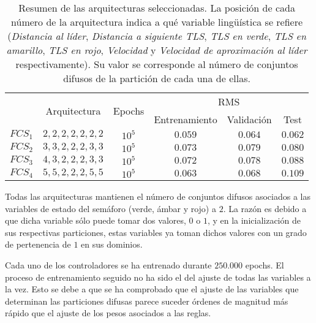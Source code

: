 \begin{table}
	\centering
	\small
	\caption[Resumen de las arquitecturas \ac{fcs} para el modelo longitudinal]{Resumen de las arquitecturas seleccionadas. La posición de cada número de la arquitectura indica a qué variable lingüística se refiere (\textit{Distancia al líder}, \textit{Distancia a siguiente TLS}, \textit{TLS en verde}, \textit{TLS en amarillo}, \textit{TLS en rojo}, \textit{Velocidad} y \textit{Velocidad de aproximación al líder} respectivamente). Su valor se corresponde al número de conjuntos difusos de la partición de cada una de ellas.}
	\label{tbl:cf-fcs-architectures}
	\begin{tabular}{cccccc}
		\toprule
		\multirow{2}{*}{} & \multirow{2}{*}{Arquitectura} & \multirow{2}{*}{Epochs} & \multicolumn{3}{c}{RMS}      \\ 
		& & & Entrenamiento & Validación & Test \\
		\midrule
		\rowcolor{black!20} $FCS_1$ & $2, 2, 2, 2, 2, 2, 2$ & $10^5$ & $0.059$ & $0.064$ & $0.062$  \\
		$FCS_2$ & $3, 3, 2, 2, 2, 3, 3$ & $10^5$ & $0.073$ & $0.079$ & $0.080$  \\
		\rowcolor{black!20} $FCS_3$ & $4, 3, 2, 2, 2, 3, 3$ & $10^5$ & $0.072$ & $0.078$ & $0.088$  \\
		$FCS_4$ & $5, 5, 2, 2, 2, 5, 5$ & $10^5$ & $0.063$ & $0.068$ & $0.109$  \\
		\bottomrule
	\end{tabular}
\end{table}

Todas las arquitecturas mantienen el número de conjuntos difusos asociados a las variables de estado del semáforo (verde, ámbar y rojo) a $2$. La razón es debido a que dicha variable sólo puede tomar dos valores, $0$ o $1$, y en la inicialización de sus respectivas particiones, estas variables ya toman dichos valores con un grado de pertenencia de $1$ en sus dominios.

Cada uno de los controladores se ha entrenado durante $250.000$ epochs. El proceso de entrenamiento seguido no ha sido el del ajuste de todas las variables a la vez. Esto se debe a que se ha comprobado que el ajuste de las variables que determinan las particiones difusas parece suceder órdenes de magnitud más rápido que el ajuste de los pesos asociados a las reglas.


